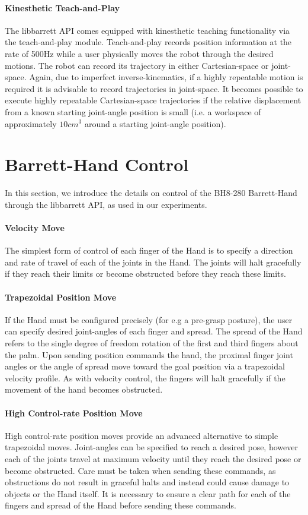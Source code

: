 \paragraph{Kinesthetic Teach-and-Play}
The libbarrett API comes equipped with kinesthetic teaching functionality via the teach-and-play module.
Teach-and-play records position information at the rate of 500Hz while a user physically moves the robot through the desired motions.
The robot can record its trajectory in either Cartesian-space or joint-space.
Again, due to imperfect inverse-kinematics, if a highly repeatable motion is required it is advisable to record trajectories in joint-space.
It becomes possible to execute highly repeatable Cartesian-space trajectories if the relative displacement from a known starting joint-angle position is small (i.e. a workspace of approximately $10cm^3$ around a starting joint-angle position).

\section{Barrett-Hand Control}

In this section, we introduce the details on control of the BH8-280 Barrett-Hand through the libbarrett API, as used in our experiments.

\paragraph{Velocity Move}
The simplest form of control of each finger of the Hand is to specify a direction and rate of travel of each of the joints in the Hand.
The joints will halt gracefully if they reach their limits or become obstructed before they reach these limits.

\paragraph{Trapezoidal Position Move}
If the Hand must be configured precisely (for e.g a pre-grasp posture), the user can specify desired joint-angles of each finger and spread.
The spread of the Hand refers to the single degree of freedom rotation of the first and third fingers about the palm.
Upon sending position commands the hand, the proximal finger joint angles or the angle of spread move toward the goal position via a trapezoidal velocity profile.
As with velocity control, the fingers will halt gracefully if the movement of the hand becomes obstructed.

\paragraph{High Control-rate Position Move}
High control-rate position moves provide an advanced alternative to simple trapezoidal moves.
Joint-angles can be specified to reach a desired pose, however each of the joints travel at maximum velocity until they reach the desired pose or become obstructed.
Care must be taken when sending these commands, as obstructions do not result in graceful halts and instead could cause damage to objects or the Hand itself.
It is necessary to ensure a clear path for each of the fingers and spread of the Hand before sending these commands.

